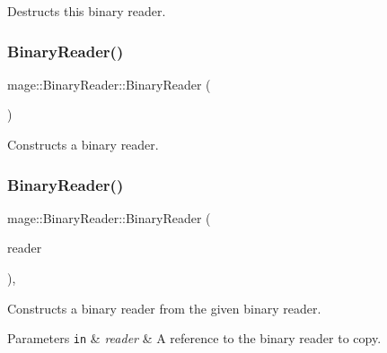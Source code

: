 Destructs this binary reader. \hypertarget{classmage_1_1_binary_reader_aab82579cef4f2f022273cf1adfcc8497}{}\label{classmage_1_1_binary_reader_aab82579cef4f2f022273cf1adfcc8497} 
\subsubsection{\texorpdfstring{Binary\+Reader()}{BinaryReader()}\hspace{0.1cm}{\footnotesize\ttfamily [1/3]}}
{\footnotesize\ttfamily mage\+::\+Binary\+Reader\+::\+Binary\+Reader (\begin{DoxyParamCaption}{ }\end{DoxyParamCaption})\hspace{0.3cm}{\ttfamily [protected]}}

Constructs a binary reader. \hypertarget{classmage_1_1_binary_reader_a8c1ff948f1d056439f3d8cc37d7f507c}{}\label{classmage_1_1_binary_reader_a8c1ff948f1d056439f3d8cc37d7f507c} 
\subsubsection{\texorpdfstring{Binary\+Reader()}{BinaryReader()}\hspace{0.1cm}{\footnotesize\ttfamily [2/3]}}
{\footnotesize\ttfamily mage\+::\+Binary\+Reader\+::\+Binary\+Reader (\begin{DoxyParamCaption}\item[{const \hyperlink{classmage_1_1_binary_reader}{Binary\+Reader} \&}]{reader }\end{DoxyParamCaption})\hspace{0.3cm}{\ttfamily [protected]}, {\ttfamily [delete]}}

Constructs a binary reader from the given binary reader.


\begin{DoxyParams}[1]{Parameters}
\mbox{\tt in}  & {\em reader} & A reference to the binary reader to copy. \\
\hline
\end{DoxyParams}
\hypertarget{classmage_1_1_binary_reader_a5d9504fb2556cb346713bceacc3237dd}{}\label{classmage_1_1_binary_reader_a5d9504fb2556cb346713bceacc3237dd} 
